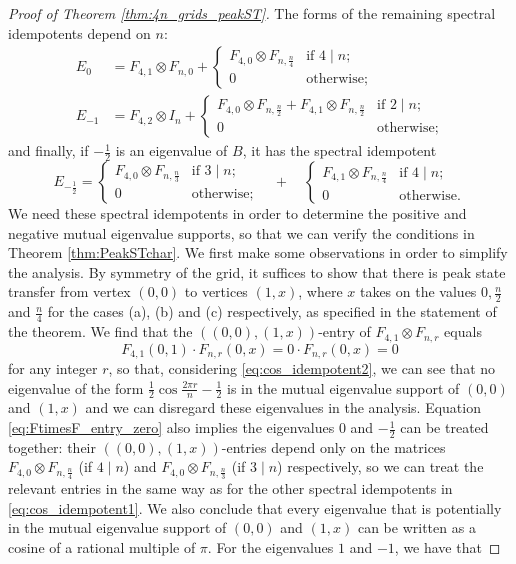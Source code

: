 \documentclass{article}
\numberwithin{equation}{section}
\begin{document}
\begin{proof}[Proof of Theorem \ref{thm:4n_grids_peakST}]
The forms of the remaining spectral idempotents depend on $n$:
\begin{align*}
E_0 &= F_{4,1} \otimes F_{n,0} + \begin{cases}
F_{4,0} \otimes F_{n,\frac{n}{4}} &\text{if $4\mid n$}; \\
0 &\text{otherwise;}
\end{cases} \\
E_{-1} &= F_{4,2} \otimes I_n + \begin{cases}
F_{4,0} \otimes F_{n,\frac{n}{2}} + F_{4,1} \otimes F_{n,\frac{n}{2}} &\text{if $2\mid n$}; \\
0 &\text{otherwise;}
\end{cases}
\end{align*}
and finally, if $-\frac{1}{2}$ is an eigenvalue of $B$, it has the spectral idempotent
\[
E_{-\frac{1}{2}} = \begin{cases}
F_{4,0} \otimes F_{n,\frac{n}{3}} &\text{if $3\mid n$}; \\
0 &\text{otherwise;}
\end{cases} \quad + \quad 
\begin{cases}
F_{4,1} \otimes F_{n,\frac{n}{4}} &\text{if $4\mid n$}; \\
0 &\text{otherwise.}
\end{cases}
\]
We need these spectral idempotents in order to determine the positive and negative mutual eigenvalue supports, so that we can verify the conditions in Theorem \ref{thm:PeakSTchar}. We first make some observations in order to simplify the analysis. By symmetry of the grid, it suffices to show that there is peak state transfer from vertex $(0,0)$ to vertices $(1,x)$, where $x$ takes on the values $0,\frac{n}{2}$ and $\frac{n}{4}$ for the cases (a), (b) and (c) respectively, as specified in the statement of the theorem. We find that the $((0,0),(1,x))$-entry of $F_{4,1} \otimes F_{n,r}$ equals
\begin{equation}
\label{eq:FtimesF_entry_zero}
F_{4,1}(0,1) \cdot F_{n,r}(0,x) = 0\cdot F_{n,r}(0,x) = 0
\end{equation}
for any integer $r$, so that, considering \eqref{eq:cos_idempotent2}, we can see that no eigenvalue of the form $\frac{1}{2}\cos\frac{2\pi r}{n} - \frac{1}{2}$ is in the mutual eigenvalue support of $(0,0)$ and $(1,x)$ and we can disregard these eigenvalues in the analysis. Equation \eqref{eq:FtimesF_entry_zero} also implies  the eigenvalues $0$ and $-\frac{1}{2}$ can be treated together: their $((0,0),(1,x))$-entries depend only on the matrices $F_{4,0} \otimes F_{n,\frac{n}{4}}$ (if $4 \mid n$) and $F_{4,0} \otimes F_{n,\frac{n}{3}}$ (if $3 \mid n$) respectively, so we can treat the relevant entries in the same way as for the other spectral idempotents in \eqref{eq:cos_idempotent1}. We also conclude that every eigenvalue that is potentially in the mutual eigenvalue support of $(0,0)$ and $(1,x)$ can be written as a cosine of a rational multiple of $\pi$. For the eigenvalues $1$ and $-1$, we have that

\end{proof}
\end{document}
